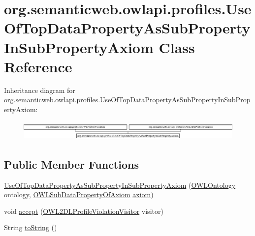 \hypertarget{classorg_1_1semanticweb_1_1owlapi_1_1profiles_1_1_use_of_top_data_property_as_sub_property_in_sub_property_axiom}{\section{org.\-semanticweb.\-owlapi.\-profiles.\-Use\-Of\-Top\-Data\-Property\-As\-Sub\-Property\-In\-Sub\-Property\-Axiom Class Reference}
\label{classorg_1_1semanticweb_1_1owlapi_1_1profiles_1_1_use_of_top_data_property_as_sub_property_in_sub_property_axiom}
}
Inheritance diagram for org.\-semanticweb.\-owlapi.\-profiles.\-Use\-Of\-Top\-Data\-Property\-As\-Sub\-Property\-In\-Sub\-Property\-Axiom\-:\begin{figure}[H]
\begin{center}
\leavevmode
\includegraphics[height=1.042830cm]{classorg_1_1semanticweb_1_1owlapi_1_1profiles_1_1_use_of_top_data_property_as_sub_property_in_sub_property_axiom}
\end{center}
\end{figure}
\subsection*{Public Member Functions}
\begin{DoxyCompactItemize}
\item 
\hyperlink{classorg_1_1semanticweb_1_1owlapi_1_1profiles_1_1_use_of_top_data_property_as_sub_property_in_sub_property_axiom_a58e164088b2e7dc224549f6f00344203}{Use\-Of\-Top\-Data\-Property\-As\-Sub\-Property\-In\-Sub\-Property\-Axiom} (\hyperlink{interfaceorg_1_1semanticweb_1_1owlapi_1_1model_1_1_o_w_l_ontology}{O\-W\-L\-Ontology} ontology, \hyperlink{interfaceorg_1_1semanticweb_1_1owlapi_1_1model_1_1_o_w_l_sub_data_property_of_axiom}{O\-W\-L\-Sub\-Data\-Property\-Of\-Axiom} \hyperlink{classorg_1_1semanticweb_1_1owlapi_1_1profiles_1_1_o_w_l_profile_violation_aa7c8e8910ed3966f64a2c003fb516214}{axiom})
\item 
void \hyperlink{classorg_1_1semanticweb_1_1owlapi_1_1profiles_1_1_use_of_top_data_property_as_sub_property_in_sub_property_axiom_af7f2dd39b81eab0ec12c3b98b9bcbf36}{accept} (\hyperlink{interfaceorg_1_1semanticweb_1_1owlapi_1_1profiles_1_1_o_w_l2_d_l_profile_violation_visitor}{O\-W\-L2\-D\-L\-Profile\-Violation\-Visitor} visitor)
\item 
String \hyperlink{classorg_1_1semanticweb_1_1owlapi_1_1profiles_1_1_use_of_top_data_property_as_sub_property_in_sub_property_axiom_a42451a73244f6ef09ecba62d55930c34}{to\-String} ()
\end{DoxyCompactItemize}


